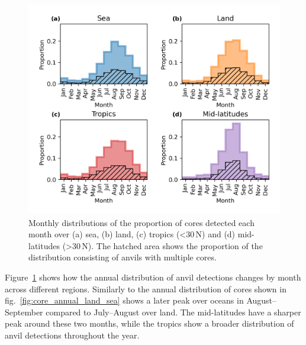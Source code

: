 \begin{figure}[tp]
    \centering
    \includegraphics[width=\textwidth]{figures/chapter2_17.png}
    \caption[
    Monthly distributions of the proportion of cores detected each month over land, sea, tropics and mid-latitudes
    ]{
    Monthly distributions of the proportion of cores detected each month over (a) sea, (b) land, (c) tropics (\textless 30\,\textdegree N) and (d) mid-latitudes (\textgreater 30\,\textdegree N). The hatched area shows the proportion of the distribution consisting of anvils with multiple cores.
    }
    \label{fig:anvil_monthly_cycles}
\end{figure}

Figure~\ref{fig:anvil_monthly_cycles} shows how the annual distribution of anvil detections changes by month across different regions.
Similarly to the annual distribution of cores shown in fig.~\ref{fig:core_annual_land_sea} shows a later peak over oceans in August--September compared to July--August over land.
The mid-latitudes have a sharper peak around these two months, while the tropics show a broader distribution of anvil detections throughout the year.


